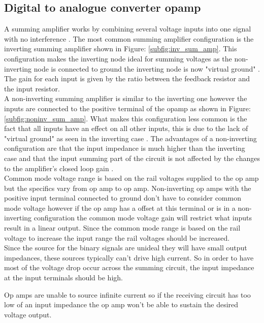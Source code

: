 \subsection{Digital to analogue converter opamp}
A summing amplifier works by combining several voltage inputs into one signal with no interference \cite{Lit_SumAmp}. The most common summing amplifier configuration is the inverting summing amplifier shown in Figure: \ref{subfig:inv_sum_amp}. This configuration makes the inverting node ideal for summing voltages as the non-inverting node is connected to ground the inverting node is now "virtual ground" \cite{Lit_SumAmp}. The gain for each input is given by the ratio between the feedback resistor and the input resistor.
\medskip\\
A non-inverting summing amplifier is similar to the inverting one however the inputs are connected to the positive terminal of the opamp as shown in Figure: \ref{subfig:noninv_sum_amp}. What makes this configuration less common is the fact that all inputs have an effect on all other inputs, this is due to the lack of "virtual ground" as seen in the inverting case \cite{Lit_SumAmp}. The advantages of a non-inverting configuration are that the input impedance is much higher than the inverting case and that the input summing part of the circuit is not affected by the changes to the amplifier's closed loop gain \cite{Lit_SumAmp_ET}.
\medskip\\
Common mode voltage range is based on the rail voltages supplied to the op amp but the specifics vary from op amp to op amp. Non-inverting op amps with the positive input terminal connected to ground don't have to consider common mode voltage however if the op amp has a offset at this terminal or is in a non-inverting configuration the common mode voltage gain will restrict what inputs result in a linear output. Since the common mode range is based on the rail voltage to increase the input range the rail voltages should be increased.
\medskip\\
Since the source for the binary signals are unideal they will have small output impedances, these sources typically can't drive high current. So in order to have most of the voltage drop occur across the summing circuit, the input impedance at the input terminals should be high.

Op amps are unable to source infinite current so if the receiving circuit has too low of an input impedance the op amp won't be able to sustain the desired voltage output. 


